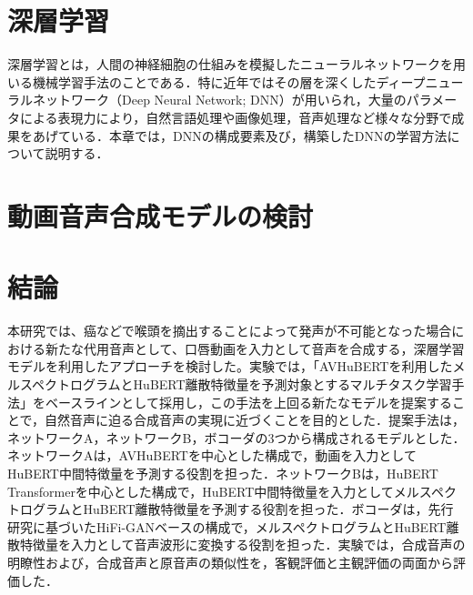 \documentclass[12pt]{jarticle}
\numberwithin{equation}{section}    %
\numberwithin{figure}{section}      %
\numberwithin{table}{section}      %
\begin{document}
\clearpage

\setcounter{tocdepth}{3}
\tableofcontents
\thispagestyle{empty}
\clearpage

\pagestyle{plain}
\setcounter{page}{1}


\clearpage


\clearpage

\section{深層学習}
深層学習とは，人間の神経細胞の仕組みを模擬したニューラルネットワークを用いる機械学習手法のことである．特に近年ではその層を深くしたディープニューラルネットワーク（Deep Neural Network; DNN）が用いられ，大量のパラメータによる表現力により，自然言語処理や画像処理，音声処理など様々な分野で成果をあげている．本章では，DNNの構成要素及び，構築したDNNの学習方法について説明する．



\clearpage

\section{動画音声合成モデルの検討}





\clearpage

\section{結論}
本研究では、癌などで喉頭を摘出することによって発声が不可能となった場合における新たな代用音声として、口唇動画を入力として音声を合成する，深層学習モデルを利用したアプローチを検討した。実験では，「AVHuBERTを利用したメルスペクトログラムとHuBERT離散特徴量を予測対象とするマルチタスク学習手法」をベースラインとして採用し，この手法を上回る新たなモデルを提案することで，自然音声に迫る合成音声の実現に近づくことを目的とした．提案手法は，ネットワークA，ネットワークB，ボコーダの3つから構成されるモデルとした．ネットワークAは，AVHuBERTを中心とした構成で，動画を入力としてHuBERT中間特徴量を予測する役割を担った．ネットワークBは，HuBERT Transformerを中心とした構成で，HuBERT中間特徴量を入力としてメルスペクトログラムとHuBERT離散特徴量を予測する役割を担った．ボコーダは，先行研究に基づいたHiFi-GANベースの構成で，メルスペクトログラムとHuBERT離散特徴量を入力として音声波形に変換する役割を担った．実験では，合成音声の明瞭性および，合成音声と原音声の類似性を，客観評価と主観評価の両面から評価した．
\end{document}
